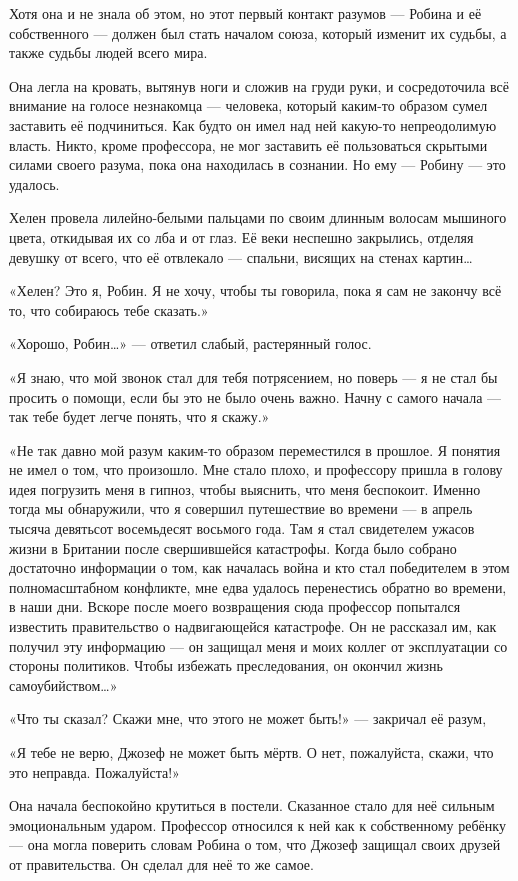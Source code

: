 \documentclass[a5paper, 9pt,
final, openany, twoside=true]{memoir}
\begin{document}
Хотя она и не знала об этом, но этот первый контакт разумов — Робина и её собственного — должен был стать началом союза, который изменит их судьбы, а также судьбы людей всего мира.

Она легла на кровать, вытянув ноги и сложив на груди руки, и сосредоточила всё внимание на голосе незнакомца — человека, который каким-то образом сумел заставить её подчиниться. Как будто он имел над ней какую-то непреодолимую власть. Никто, кроме профессора, не мог заставить её пользоваться скрытыми силами своего разума, пока она находилась в сознании. Но ему — Робину — это удалось.

Хелен провела лилейно-белыми пальцами по своим длинным волосам мышиного цвета, откидывая их со лба и от глаз. Её веки неспешно закрылись, отделяя девушку от всего, что её отвлекало — спальни, висящих на стенах картин…\bigskip

«Хелен? Это я, Робин. Я не хочу, чтобы ты говорила, пока я сам не закончу всё то, что собираюсь тебе сказать.»

«Хорошо, Робин…» — ответил слабый, растерянный голос.

«Я знаю, что мой звонок стал для тебя потрясением, но поверь — я не стал бы просить о помощи, если бы это не было очень важно. Начну с самого начала — так тебе будет легче понять, что я скажу.»

«Не так давно мой разум каким-то образом переместился в прошлое. Я понятия не имел о том, что произошло. Мне стало плохо, и профессору пришла в голову идея погрузить меня в гипноз, чтобы выяснить, что меня беспокоит. Именно тогда мы обнаружили, что я совершил путешествие во времени — в апрель тысяча девятьсот восемьдесят восьмого года. Там я стал свидетелем ужасов жизни в Британии после свершившейся катастрофы. Когда было собрано достаточно информации о том, как началась война и кто стал победителем в этом полномасштабном конфликте, мне едва удалось перенестись обратно во времени, в наши дни. Вскоре после моего возвращения сюда профессор попытался известить правительство о надвигающейся катастрофе. Он не рассказал им, как получил эту информацию — он защищал меня и моих коллег от эксплуатации со стороны политиков. Чтобы избежать преследования, он окончил жизнь самоубийством…»

«Что ты сказал? Скажи мне, что этого не может быть!» — закричал её разум,

«Я тебе не верю, Джозеф не может быть мёртв. О нет, пожалуйста, скажи, что это неправда. Пожалуйста!»

Она начала беспокойно крутиться в постели. Сказанное стало для неё сильным эмоциональным ударом. Профессор относился к ней как к собственному ребёнку — она могла поверить словам Робина о том, что Джозеф защищал своих друзей от правительства. Он сделал для неё то же самое.
\end{document}
